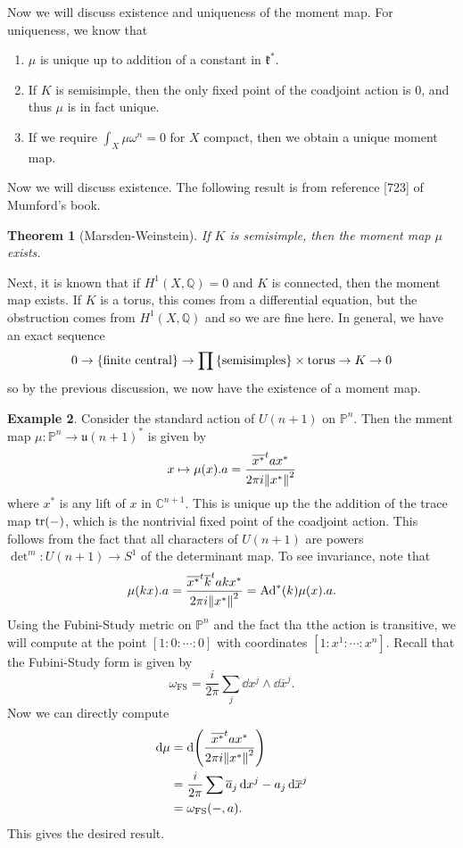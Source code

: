 \documentclass[leqno, openany]{memoir}
\newtheorem{thm}{Theorem}[section]
\theoremstyle{definition}
\newtheorem{exm}[thm]{Example}
\theoremstyle{remark}
\theoremstyle{plain}
\theoremstyle{definition}
\theoremstyle{remark}
\newcommand{\C}{\mathbb{C}}
\newcommand{\Q}{\mathbb{Q}}
\renewcommand{\P}{\mathbb{P}}
\newcommand{\mf}[1]{\mathfrak{#1}}
\newcommand{\mr}[1]{\mathrm{#1}}
\newcommand{\ol}[1]{\overline{#1}}
\begin{document}
Now we will discuss existence and uniqueness of the moment map. For uniqueness,
we know that \begin{enumerate} \item $\mu$ is unique up to addition of a
    constant in $\mf{k}^*$.  \item If $K$ is semisimple, then the only fixed
    point of the coadjoint action is $0$, and thus $\mu$ is in fact unique.
    \item If we require $\int_X \mu \omega^n = 0$ for $X$ compact, then we
obtain a unique moment map.  \end{enumerate}

Now we will discuss existence. The following result is from reference [723] of
Mumford's book.

\begin{thm}[Marsden-Weinstein] If $K$ is semisimple, then the moment map $\mu$
exists.  \end{thm}

Next, it is known that if $H^1(X,\Q) = 0$ and $K$ is connected, then the moment
map exists. If $K$ is a torus, this comes from a differential equation, but the
obstruction comes from $H^1(X, \Q)$ and so we are fine here. In general, we
have an exact sequence \[ 0 \to \qty{\text{finite central}} \to \prod
\qty{\text{semisimples}} \times \text{torus} \to K \to 0 \] so by the previous
discussion, we now have the existence of a moment map.

\begin{exm} Consider the standard action of $U(n+1)$ on $\P^n$. Then the mment
    map $\mu \colon \P^n \to \mf{u}(n+1)^*$ is given by \[ x \mapsto \mu(x) .a
    = \frac{\ol{x^*}^t a x^*}{2 \pi i \norm{x^*}^2} \] where $x^*$ is any lift
    of $x$ in $\C^{n+1}$. This is unique up the the addition of the trace map
    $\tr(-)$, which is the nontrivial fixed point of the coadjoint action. This
    follows from the fact that all characters of $U(n+1)$ are powers $\det^m
    \colon U(n+1) \to S^1$ of the determinant map. To see invariance, note that
    \[ \mu(kx).a = \frac{\ol{x^*}^t \ol{k}^t a k x^*}{2 \pi i \norm{x^*}^2} =
    \mr{Ad}^*(k) \mu(x).a. \] Using the Fubini-Study metric on $\P^n$ and the
    fact tha tthe action is transitive, we will compute at the point $[
    1:0:\cdots :0 ]$ with coordinates $[1:x^1:\cdots :x^n]$. Recall that the
    Fubini-Study form is given by \[ \omega_{\mr{FS}} = \frac{i}{2\pi} \sum_j
        \dd{x}^j \wedge \dd{\ol{x}}^j. \] Now we can directly compute
        \begin{align*} \dd{\mu} &= \dd{\qty(\frac{\ol{x^*}^t a x^*}{2 \pi i
            \norm{x^*}^2})} \\ &= \frac{i}{2\pi} \sum \ol{a}_j \dd{x^j} - a_j
            \dd{\ol{x}}^j \\ &= \omega_{\mr{FS}}(-,a).  \end{align*} This gives
        the desired result.  \end{exm}
\end{document}
